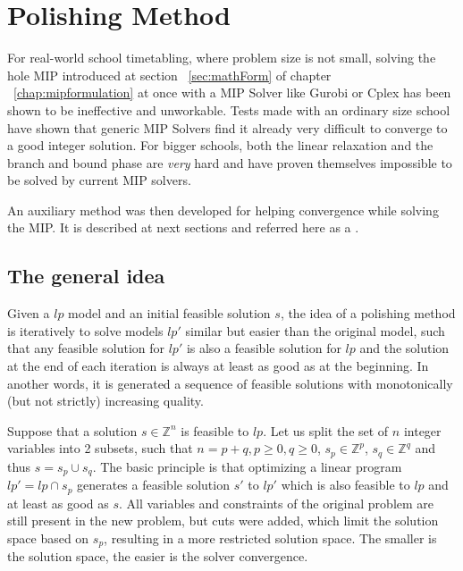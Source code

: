 \section{Polishing Method}

For real-world school timetabling, where problem size is not small, solving the hole MIP introduced at section ~\ref{sec:mathForm} of chapter ~\ref{chap:mipformulation} at once with a MIP Solver like Gurobi or Cplex has been shown to be ineffective and unworkable. Tests made with an ordinary size school  have shown that generic MIP Solvers find it already very difficult to converge to a good integer solution. For bigger schools, both the linear relaxation and the branch and bound phase are \textit{very} hard and have proven themselves impossible to be solved by current MIP solvers.

An auxiliary method was then developed for helping convergence while solving the MIP. It is described at next sections and referred here as a .


\subsection{The general idea}

Given a $lp$ model and an initial feasible solution $s$, the idea of a polishing method is iteratively to solve models $lp'$ similar but easier than the original model, such that any feasible solution for $lp'$ is also a feasible solution for $lp$ and the solution at the end of each iteration is always at least as good as at the beginning. In another words, it is generated a sequence of feasible solutions with monotonically (but not strictly) increasing quality.

Suppose that a solution $s \in \mathbb{Z}^n$ is feasible to $lp$. Let us split the set of $n$ integer variables into 2 subsets, such that $n=p+q, p \ge 0, q\ge 0$, $s_p \in \mathbb{Z}^p$, $s_q \in \mathbb{Z}^q$ and thus $s = s_p \cup s_q$. The basic principle is that optimizing a linear program $lp' = lp \cap s_p$ generates a feasible solution $s'$ to $lp'$ which is also feasible to $lp$ and at least as good as $s$. All variables and constraints of the original problem are still present in the new problem, but cuts were added, which limit the solution space based on $s_p$, resulting in a more restricted solution space. The smaller is the solution space, the easier is the solver convergence.

